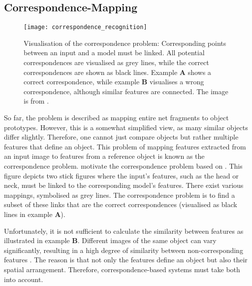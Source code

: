 \subsection{Correspondence-Mapping}
\begin{figure}[h]
    \centering
    \texttt{[image: correspondence\_recognition]}
    \caption[The visual correspondence problem]{Visualisation of the correspondence problem: Corresponding points between an input and a model must be linked. All potential correspondences are visualised as grey lines, while the correct correspondences are shown as black lines. Example $\boldsymbol{A}$ shows a correct correspondence, while example $\boldsymbol{B}$ visualises a wrong correspondence, although similar features are connected. The image is from \cite{wolfrum_recurrent_2008}.}
\end{figure}

So far, the problem is described as mapping entire net fragments to object prototypes.
However, this is a somewhat simplified view, as many similar objects differ slightly.
Therefore, one cannot just compare objects but rather multiple features that define an object.
This problem of mapping features extracted from an input image to features from a reference object is known as the correspondence problem.
 motivate the correspondence problem based on . This figure depicts two stick figures where the input's features, such as the head or neck, must be linked to the corresponding model's features.
There exist various mappings, symbolised as grey lines.
The correspondence problem is to find a subset of these links that are the correct correspondences (visualised as black lines in example $\boldsymbol{A}$). 

Unfortunately, it is not sufficient to calculate the similarity between features as illustrated in 
 example $\boldsymbol{B}$. Different images of the same object can vary significantly, resulting in a high degree of similarity between non-corresponding features . The reason is that not only the features define an object but also their spatial arrangement. Therefore, correspondence-based systems must take both into account.

